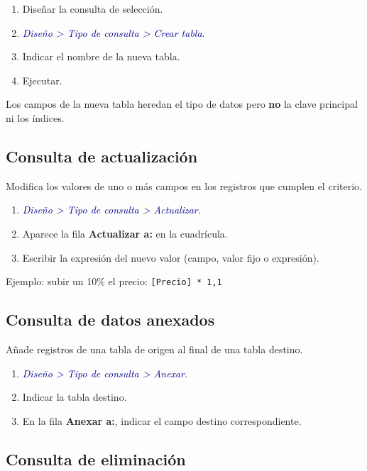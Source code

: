 \documentclass[12pt,a4paper]{article}
\newcommand{\menu}[1]{\textit{\textcolor{darkblue}{#1}}}
\begin{document}
\begin{enumerate}
  \item Diseñar la consulta de selección.
  \item \menu{Diseño > Tipo de consulta > Crear tabla}.
  \item Indicar el nombre de la nueva tabla.
  \item Ejecutar.
\end{enumerate}

\begin{nota}
Los campos de la nueva tabla heredan el tipo de datos pero \textbf{no} la clave principal ni los índices.
\end{nota}

\subsection{Consulta de actualización}

Modifica los valores de uno o más campos en los registros que cumplen el criterio.

\begin{enumerate}
  \item \menu{Diseño > Tipo de consulta > Actualizar}.
  \item Aparece la fila \textbf{Actualizar a:} en la cuadrícula.
  \item Escribir la expresión del nuevo valor (campo, valor fijo o expresión).
\end{enumerate}

Ejemplo: subir un 10\% el precio: \texttt{[Precio] * 1,1}

\subsection{Consulta de datos anexados}

Añade registros de una tabla de origen al final de una tabla destino.

\begin{enumerate}
  \item \menu{Diseño > Tipo de consulta > Anexar}.
  \item Indicar la tabla destino.
  \item En la fila \textbf{Anexar a:}, indicar el campo destino correspondiente.
\end{enumerate}

\subsection{Consulta de eliminación}
\end{document}
